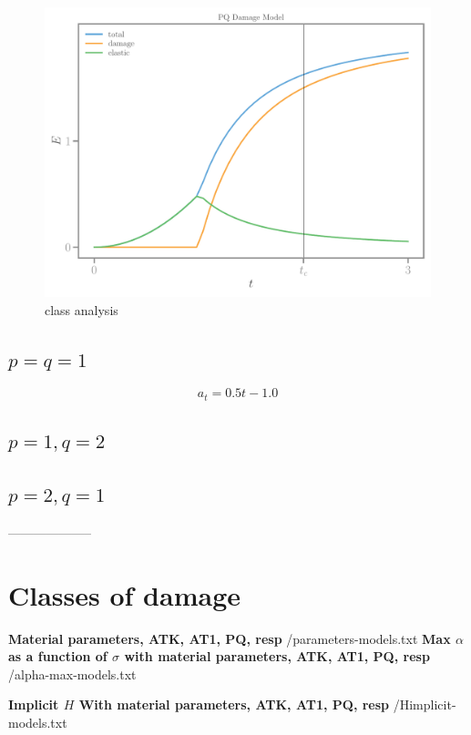 \documentclass[]{article}
\begin{document}
\begin{figure}[htbp]
  \includegraphics[width=.33\textheight]{../figures/pq-energies-homog.pdf}
  \caption{class analysis}
  \label{fig:class-analyser}
\end{figure}


\subsection*{$p=q=1$}

$$
a_t = 0.5 t - 1.0
$$
\subsection*{$p=1, q=2$}
\subsection*{$p=2, q=1$}

--------------------

\clearpage

\section*{Classes of damage}

\textbf{Material parameters, ATK, AT1, PQ, resp}
{/parameters-models.txt}
\textbf{Max $\alpha$ as a function of $\sigma$ with material parameters, ATK, AT1, PQ, resp}
{/alpha-max-models.txt}

\textbf{Implicit $H$ With material parameters, ATK, AT1, PQ, resp}
{/Himplicit-models.txt}
\end{document}
